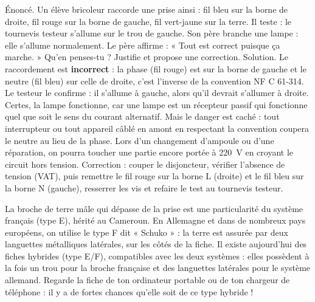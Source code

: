 \documentclass[11pt]{article}
\begin{document}
\begin{exoresolu}
Énoncé. Un élève bricoleur raccorde une prise ainsi : fil bleu sur la borne de droite, fil rouge sur la borne de gauche, fil vert-jaune sur la terre. Il teste : le tournevis testeur s'allume sur le trou de gauche. Son père branche une lampe : elle s'allume normalement. Le père affirme : « Tout est correct puisque ça marche. » Qu'en penses-tu ? Justifie et propose une correction.
\tcblower
Solution. Le raccordement est \textbf{incorrect} : la phase (fil rouge) est sur la borne de gauche et le neutre (fil bleu) sur celle de droite, c'est l'inverse de la convention NF C 61-314. Le testeur le confirme : il s'allume à gauche, alors qu'il devrait s'allumer à droite. Certes, la lampe fonctionne, car une lampe est un récepteur passif qui fonctionne quel que soit le sens du courant alternatif. Mais le danger est caché : tout interrupteur ou tout appareil câblé en amont en respectant la convention coupera le neutre au lieu de la phase. Lors d'un changement d'ampoule ou d'une réparation, on pourra toucher une partie encore portée à \SI{220}{V} en croyant le circuit hors tension. Correction : couper le disjoncteur, vérifier l'absence de tension (VAT), puis remettre le fil rouge sur la borne L (droite) et le fil bleu sur la borne N (gauche), resserrer les vis et refaire le test au tournevis testeur.
\end{exoresolu}

\begin{savaistu}
La broche de terre mâle qui dépasse de la prise est une particularité du système français (type E), hérité au Cameroun. En Allemagne et dans de nombreux pays européens, on utilise le type F dit « Schuko » : la terre est assurée par deux languettes métalliques latérales, sur les côtés de la fiche. Il existe aujourd'hui des fiches hybrides (type E/F), compatibles avec les deux systèmes : elles possèdent à la fois un trou pour la broche française et des languettes latérales pour le système allemand. Regarde la fiche de ton ordinateur portable ou de ton chargeur de téléphone : il y a de fortes chances qu'elle soit de ce type hybride !
\end{savaistu}
\end{document}
